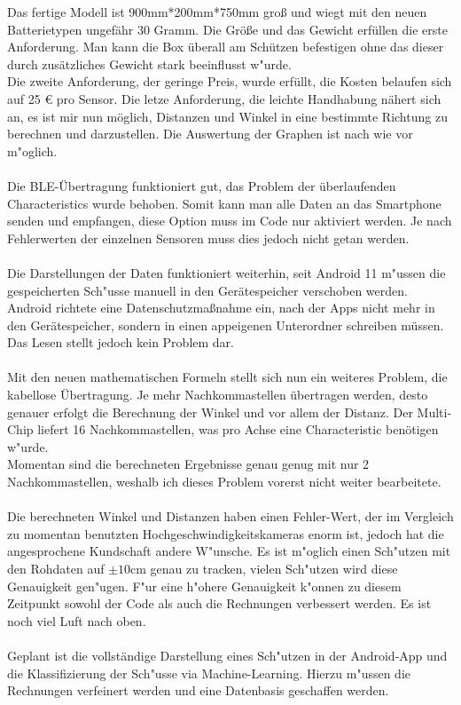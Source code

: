
Das fertige Modell ist 900mm*200mm*750mm groß und wiegt mit den 
neuen Batterietypen ungefähr 30 Gramm. Die Größe und das Gewicht 
erfüllen die erste Anforderung. Man kann die Box überall am 
Schützen befestigen ohne das dieser durch zusätzliches Gewicht 
stark beeinflusst w"urde.\\
Die zweite Anforderung, der geringe Preis, wurde erfüllt, die
Kosten belaufen sich auf 25 \euro{} pro Sensor. Die letze Anforderung,
die leichte Handhabung nähert sich an, es ist mir nun möglich, Distanzen
und Winkel in eine bestimmte Richtung zu berechnen und darzustellen.
Die Auswertung der Graphen ist nach wie vor m"oglich.\\
\\
Die BLE-Übertragung funktioniert gut, das Problem der überlaufenden
Characteristics wurde behoben. Somit kann man alle Daten an das 
Smartphone senden und empfangen, diese Option muss im Code nur 
aktiviert werden. Je nach Fehlerwerten der einzelnen Sensoren muss dies 
jedoch nicht getan werden.\\
\\
Die Darstellungen der Daten funktioniert weiterhin, seit Android 11
m"ussen die gespeicherten Sch"usse manuell in den Gerätespeicher 
verschoben werden. Android richtete eine Datenschutzmaßnahme ein, 
nach der Apps nicht mehr in den Gerätespeicher, sondern in einen
appeigenen Unterordner schreiben müssen. Das Lesen stellt jedoch
kein Problem dar.\\
\\
Mit den neuen mathematischen Formeln stellt sich nun ein weiteres
Problem, die kabellose Übertragung. Je mehr Nachkommastellen übertragen
werden, desto genauer erfolgt die Berechnung der Winkel und vor allem 
der Distanz. Der Multi-Chip liefert 16 Nachkommastellen, was pro Achse
eine Characteristic benötigen w"urde.\\
Momentan sind die berechneten Ergebnisse genau genug mit nur 2 
Nachkommastellen, weshalb ich dieses Problem vorerst nicht weiter bearbeitete.\\
\\
Die berechneten Winkel und Distanzen haben einen Fehler-Wert, der im Vergleich
zu momentan benutzten Hochgeschwindigkeitskameras enorm ist, jedoch 
hat die angesprochene Kundschaft andere W"unsche. Es ist m"oglich 
einen Sch"utzen mit den Rohdaten auf $\pm10$cm genau zu tracken, vielen
Sch"utzen wird diese Genauigkeit gen"ugen. F"ur eine h"ohere Genauigkeit 
k"onnen zu diesem Zeitpunkt sowohl der Code als auch die Rechnungen verbessert 
werden. Es ist noch viel Luft nach oben.\\
\\
Geplant ist die vollständige Darstellung eines Sch"utzen in der Android-App
und die Klassifizierung der Sch"usse via Machine-Learning. Hierzu m"ussen
die Rechnungen verfeinert werden und eine Datenbasis geschaffen werden.